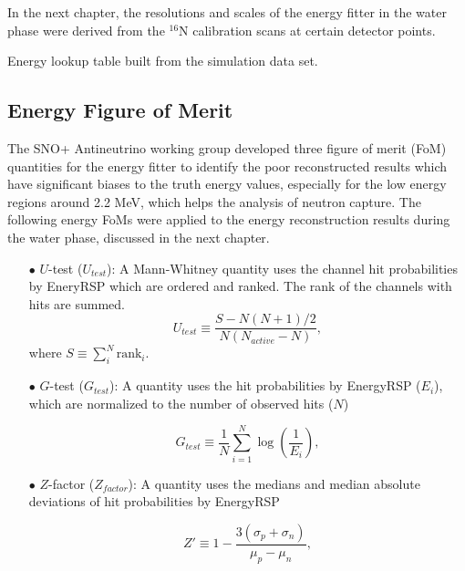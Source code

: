 In the next chapter, the resolutions and scales of the energy fitter in the water phase were derived from the $^{16}$N calibration scans at certain detector points.

Energy lookup table built from the simulation data set.

\subsection{Energy Figure of Merit}\label{sect:energy_fom}
The SNO+ Antineutrino working group developed three figure of merit (FoM) quantities for the energy fitter to identify the poor reconstructed results which have significant biases to the truth energy values, especially for the low energy regions around 2.2 MeV, which helps the analysis of neutron capture\cite{waterFoM,waterunidoc}. The following energy FoMs were applied to the energy reconstruction results during the water phase, discussed in the next chapter.

\begin{itemize}
	
	\item[$\bullet$]$U$-test ($U_{test}$):
	A Mann-Whitney quantity uses the channel hit probabilities by EneryRSP which are ordered and ranked. The rank of the channels with hits are summed.%
		\begin{equation}
		U_{test}\equiv \frac{S-N(N+1)/2}{N(N_{active}-N)},
		\end{equation}
	where $S\equiv \sum_{i}^N \mathrm{rank}_i$. 
	
	\item[$\bullet$] $G$-test ($G_{test}$):
	A quantity uses the hit probabilities by EnergyRSP ($E_i$), which are normalized to the number of observed hits ($N$) %
	
	\begin{equation}
	G_{test}\equiv \frac{1}{N}\sum_{i=1}^N \log(\frac{1}{E_i}),
	\end{equation}
	
	\item[$\bullet$] $Z$-factor ($Z_{factor}$):
	A quantity uses the medians and median absolute deviations
of hit probabilities by EnergyRSP
	
	\begin{equation}
     Z'\equiv 1-\frac{3(\sigma_p+\sigma_n)}{\mu_p-\mu_n},
    \end{equation}
\end{itemize}

